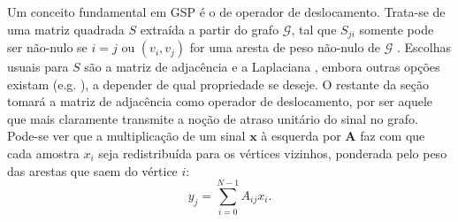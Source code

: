 %

Um conceito fundamental em GSP \'e o de operador de deslocamento. Trata-se de uma matriz quadrada $ S $ extra\'ida a partir do grafo $ \mathcal{G} $, tal que $ S_{ji} $ somente pode ser n\~ao-nulo se $ i = j $ ou $ (v_i, v_j) $ for uma aresta de peso n\~ao-nulo de $ \mathcal{G} $ \cite{segarra2015interpolation}. Escolhas usuais para $ S $ s\~ao a matriz de adjac\^encia \cite{sandryhaila2014big} e a Laplaciana \cite{shuman2013emerging}, embora outras op\c c\~oes existam (e.g. \cite{girault2015translation, dees2019unitary}), a depender de qual propriedade se deseje. O restante da se\c c\~ao tomar\'a a matriz de adjac\^encia como operador de deslocamento, por ser aquele que mais claramente transmite a no\c c\~ao de atraso unit\'ario do sinal no grafo. Pode-se ver que a multiplica\c c\~ao de um sinal $ \mathbf{x} $ \`a esquerda por $ \mathbf{A} $ faz com que cada amostra $ x_i $ seja redistribu\'ida para os v\'ertices vizinhos, ponderada pelo peso das arestas que saem do v\'ertice $ i $:
\begin{equation}
y_j = \sum_{i=0}^{N-1} A_{ij} x_i.
\end{equation}

